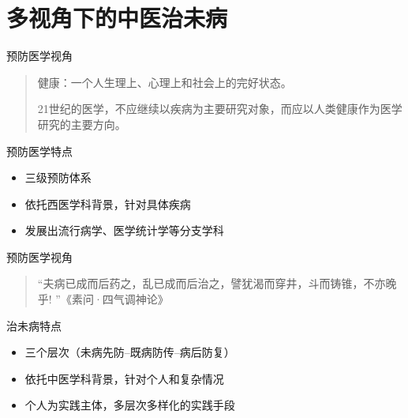 \section{多视角下的中医治未病}
\begin{frame}{预防医学视角}
\begin{quote}
    健康：一个人生理上、心理上和社会上的完好状态。
    
    21世纪的医学，不应继续以疾病为主要研究对象，而应以人类健康作为医学研究的主要方向。
\end{quote}

\begin{block}{预防医学特点}
    \begin{itemize}
        \item 三级预防体系
        \item 依托西医学科背景，针对具体疾病
        \item 发展出流行病学、医学统计学等分支学科
    \end{itemize}
\end{block}
\end{frame}

\begin{frame}{预防医学视角}
\begin{quote}
    “夫病已成而后药之，乱已成而后治之，譬犹渴而穿井，斗而铸锥，不亦晚乎! ”《素问·四气调神论》
\end{quote}

\begin{block}{治未病特点}
    \begin{itemize}
        \item 三个层次（未病先防--既病防传--病后防复）
        \item 依托中医学科背景，针对个人和复杂情况
        \item 个人为实践主体，多层次多样化的实践手段
    \end{itemize}
\end{block}
\end{frame}

